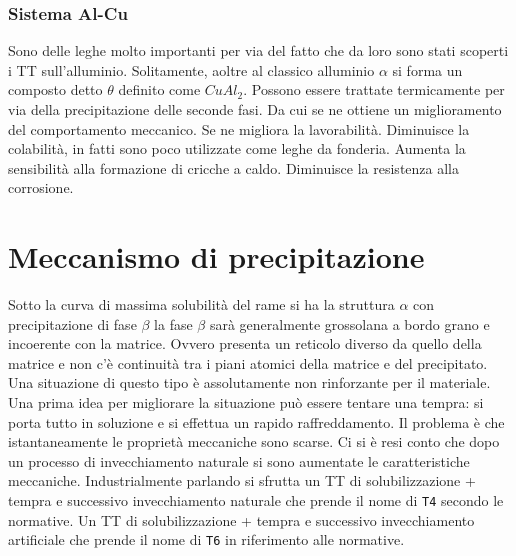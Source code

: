 \subsubsection{Sistema Al-Cu}
Sono delle leghe molto importanti per via del fatto che da loro sono stati scoperti i \ac{TT} sull'alluminio.
Solitamente, aoltre al classico alluminio $\alpha$ si forma un composto detto $\theta$ definito come $CuAl_2$.
Possono essere trattate termicamente per via della precipitazione delle seconde fasi. Da cui se ne ottiene un miglioramento del comportamento meccanico. Se ne migliora la lavorabilità. Diminuisce la colabilità, in fatti sono poco utilizzate come leghe da fonderia. Aumenta la sensibilità alla formazione di cricche a caldo. Diminuisce la resistenza alla corrosione.

\section{Meccanismo di precipitazione} 
Sotto la curva di massima solubilità del rame si ha la struttura $\alpha$ con precipitazione di fase $\beta$ 
la fase $\beta$ sarà generalmente grossolana a bordo grano e incoerente con la matrice. Ovvero presenta un reticolo diverso da quello della matrice e non c'è continuità tra i piani atomici della matrice e del precipitato.
Una situazione di questo tipo è assolutamente non rinforzante per il materiale.
Una prima idea per migliorare la situazione può essere tentare una tempra:
si porta tutto in soluzione e si effettua un rapido raffreddamento.
Il problema è che istantaneamente le proprietà meccaniche sono scarse.
Ci si è resi conto che dopo un processo di invecchiamento naturale si sono aumentate le caratteristiche meccaniche.
Industrialmente parlando si sfrutta un \ac{TT} di solubilizzazione + tempra e successivo invecchiamento naturale che prende il nome di \texttt{T4} secondo le normative. Un \ac{TT} di solubilizzazione + tempra e successivo invecchiamento artificiale che prende il nome di \texttt{T6} in riferimento alle normative.